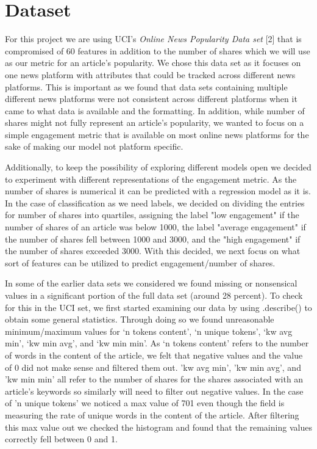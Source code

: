 \documentclass{article}
\begin{document}
\section{Dataset}

For this project we are using UCI's \textit{Online News Popularity Data set} [2] that is compromised of 60 features in addition to the number of shares which we will use as our metric for an article's popularity. We chose this data set as it focuses on one news platform with attributes that could be tracked across different news platforms. This is important as we found that data sets containing multiple different news platforms were not consistent across different platforms when it came to what data is available and the formatting. In addition, while number of shares might not fully represent an article's popularity, we wanted to focus on a simple engagement metric that is available on most online news platforms for the sake of making our model not platform specific. 

Additionally, to keep the possibility of exploring different models open we decided to experiment with different representations of the engagement metric. As the number of shares is numerical it can be predicted with a regression model as it is. In the case of classification as we need labels, we decided on dividing the entries for number of shares into quartiles, assigning the label "low engagement" if the number of shares of an article was below 1000, the label "average engagement" if the number of shares fell between 1000 and 3000, and the "high engagement" if the number of shares exceeded 3000. With this decided, we next focus on what sort of features can be utilized to predict engagement/number of shares.

In some of the earlier data sets we considered we found missing or nonsensical values in a significant portion of the full data set (around 28 percent). To check for this in the UCI set, we first started examining our data by using .describe() to obtain some general statistics. Through doing so we found unreasonable minimum/maximum values for ‘n tokens content’, ‘n unique tokens’, ‘kw avg min’, ‘kw min avg’, and ‘kw min min’. As ‘n tokens content’ refers to the number of words in the content of the article, we felt that negative values and the value of 0 did not make sense and filtered them out. 'kw avg min', 'kw min avg', and 'kw min min' all refer to the number of shares for the shares associated with an article's keywords so similarly will need to filter out negative values. In the case of 'n unique tokens' we noticed a max value of 701 even though the field is measuring the rate of unique words in the content of the article. After filtering this max value out we checked the histogram and found that the remaining values correctly fell between 0 and 1.
\end{document}
